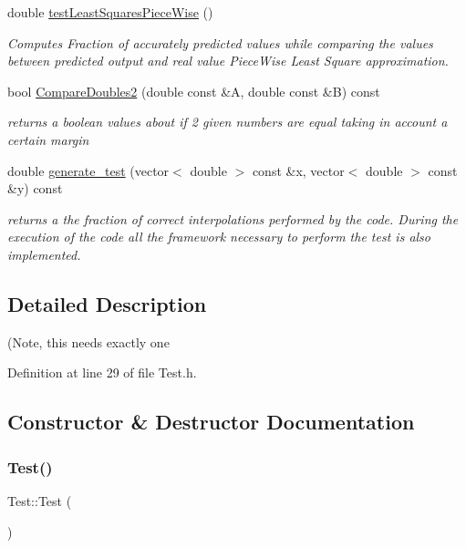 \begin{DoxyCompactItemize}
double \mbox{\hyperlink{class_test_a617c228a5a5299a5a00d3905531ae203}{test\+Least\+Squares\+Piece\+Wise}} ()
\begin{DoxyCompactList}\small\item\em Computes Fraction of accurately predicted values while comparing the values between predicted output and real value Piece\+Wise Least Square approximation. \end{DoxyCompactList}\item 
bool \mbox{\hyperlink{class_test_abdad04cdc0b60534db1fd18daa2c7f01}{Compare\+Doubles2}} (double const \&A, double const \&B) const
\begin{DoxyCompactList}\small\item\em returns a boolean values about if 2 given numbers are equal taking in account a certain margin \end{DoxyCompactList}\item 
double \mbox{\hyperlink{class_test_a80c91a350570efe1b80484dc2ecc8c66}{generate\+\_\+test}} (vector$<$ double $>$ const \&x, vector$<$ double $>$ const \&y) const
\begin{DoxyCompactList}\small\item\em returns a the fraction of correct interpolations performed by the code. During the execution of the code all the framework necessary to perform the test is also implemented. \end{DoxyCompactList}\end{DoxyCompactItemize}


\subsection{Detailed Description}
(Note, this needs exactly one 

Definition at line 29 of file Test.\+h.



\subsection{Constructor \& Destructor Documentation}
\mbox{\label{class_test_a99f2bbfac6c95612322b0f10e607ebe5}} 
\subsubsection{\texorpdfstring{Test()}{Test()}}
{\footnotesize\ttfamily Test\+::\+Test (\begin{DoxyParamCaption}{ }\end{DoxyParamCaption})}



